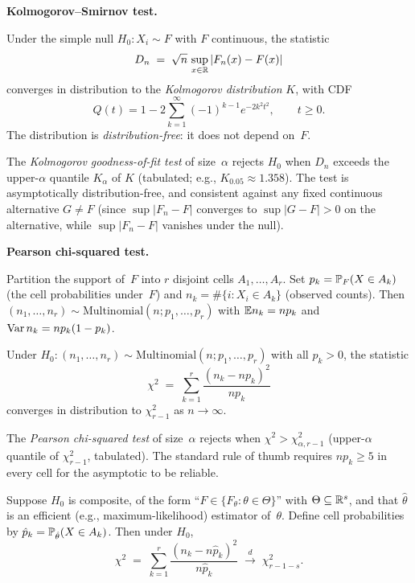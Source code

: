 \medskip
\noindent\textbf{Kolmogorov–Smirnov test.}

\begin{theorem}[Kolmogorov]
\label{thm:kolmogorov-test}
Under the simple null $H_0: X_i \sim F$ with $F$ continuous, the
statistic
\[
  D_n \;=\; \sqrt n\, \sup_{x \in \mathbb{R}} |F_n(x) - F(x)|
\]
converges in distribution to the \emph{Kolmogorov distribution}
$K$, with CDF
\[
  Q(t) = 1 - 2 \sum_{k=1}^{\infty} (-1)^{k-1} e^{-2 k^2 t^2}, \qquad t \geq 0.
\]
The distribution is \emph{distribution-free}: it does not depend
on~$F$.
\end{theorem}

The \emph{Kolmogorov goodness-of-fit test} of size~$\alpha$ rejects
$H_0$ when $D_n$ exceeds the upper-$\alpha$ quantile $K_\alpha$ of
$K$ (tabulated; e.g., $K_{0.05} \approx 1.358$). The test is
asymptotically distribution-free, and consistent against any
fixed continuous alternative $G \neq F$ (since $\sup |F_n - F|$
converges to $\sup |G - F| > 0$ on the alternative, while
$\sup |F_n - F|$ vanishes under the null).

\medskip
\noindent\textbf{Pearson chi-squared test.}

\begin{definition}
\label{def:multinomial}
Partition the support of~$F$ into $r$ disjoint cells $A_1, \dots, A_r$.
Set $p_k = \mathbb{P}_F(X \in A_k)$ (the cell probabilities under~$F$)
and $n_k = \#\{i : X_i \in A_k\}$ (observed counts). Then
$(n_1, \dots, n_r) \sim \mathrm{Multinomial}(n; p_1, \dots, p_r)$
with $\mathbb{E} n_k = n p_k$ and $\operatorname{Var} n_k = n p_k (1 - p_k)$.
\end{definition}

\begin{theorem}
\label{thm:pearson-chi2}
Under $H_0 : (n_1, \dots, n_r) \sim \mathrm{Multinomial}(n; p_1, \dots, p_r)$
with all $p_k > 0$, the statistic
\[
  \chi^2 \;=\; \sum_{k=1}^{r} \frac{(n_k - n p_k)^2}{n p_k}
\]
converges in distribution to $\chi^2_{r - 1}$ as $n \to \infty$.
\end{theorem}

The \emph{Pearson chi-squared test} of size~$\alpha$ rejects when
$\chi^2 > \chi^2_{\alpha, r - 1}$ (upper-$\alpha$ quantile of
$\chi^2_{r-1}$, tabulated). The standard rule of thumb requires
$n p_k \geq 5$ in every cell for the asymptotic to be reliable.

\begin{theorem}
\label{thm:cramer-parametric}
Suppose $H_0$ is composite, of the form
``$F \in \{F_\theta : \theta \in \Theta\}$'' with $\Theta \subseteq \mathbb{R}^s$,
and that $\hat \theta$ is an efficient (e.g., maximum-likelihood)
estimator of~$\theta$. Define cell probabilities by
$\hat p_k = \mathbb{P}_{\hat \theta}(X \in A_k)$. Then under $H_0$,
\[
  \chi^2 \;=\; \sum_{k=1}^{r} \frac{(n_k - n \hat p_k)^2}{n \hat p_k} \;\xrightarrow{d}\; \chi^2_{r - 1 - s}.
\]
\end{theorem}

